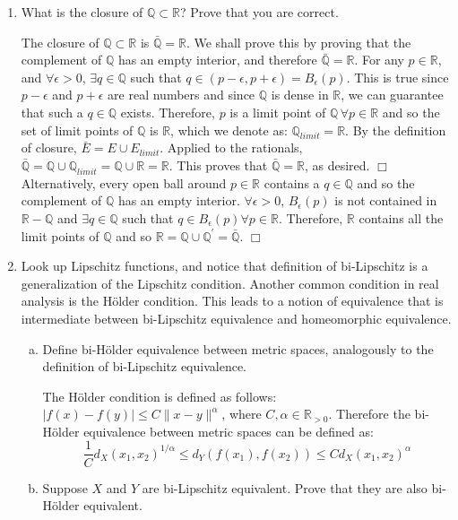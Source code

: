 \documentclass[12pt,letterpaper,reqno]{amsart}
\newcommand{\R}{\mathbb R}
\newcommand{\Q}{\mathbb Q}
\begin{document}
\begin{enumerate}[1.]
\item What is the closure of $\Q\subset \R$? Prove that you are correct.
\begin{flushleft}
The closure of $\Q\subset \R$ is $\bar{\Q} = \R$. We shall prove this by proving that the complement of $\Q$ has an empty interior, and therefore $\bar{\Q} = \R$. \newline
For any $p \in \R$, and $\forall \epsilon > 0$, $\exists q \in \Q$ such that $q \in (p-\epsilon,p+\epsilon) = B_\epsilon(p)$. This is true since $p-\epsilon$ and $p+\epsilon$ are real numbers and since $\Q$ is dense in $\R$, we can guarantee that such a $q \in \Q$ exists. Therefore, $p$ is a limit point of $\Q \, \forall p \in \R$ and so the set of limit points of $\Q$ is $\R$, which we denote as: $\Q_{limit} = \R$. By the definition of closure, $\bar{E} = E \cup E_{limit}$. Applied to the rationals, $\bar{\Q} = \Q \cup \Q_{limit} = \Q \cup \R = \R$. This proves that $\bar{\Q} = \R$, as desired. $\Box$\newline
Alternatively, every open ball around $p \in \R$ contains a $q \in \Q$ and so the complement of $\Q$ has an empty interior. $\forall \epsilon > 0$, $B_\epsilon(p)$ is not contained in $\R - \Q$ and $\exists q \in \Q$ such that $q \in B_\epsilon(p) \forall p \in \R$. Therefore, $\R$ contains all the limit points of $\Q$ and so $\R = \Q \cup \Q^\prime = \bar{\Q}$. $\Box$
\end{flushleft}

\item Look up Lipschitz functions, and notice that definition of bi-Lipschitz is a generalization of the Lipschitz condition. Another common condition in real analysis is the H\"older condition. This leads to a notion of equivalence that is intermediate between bi-Lipschitz equivalence and homeomorphic equivalence.
\begin{enumerate}[(a)]
\item Define bi-H\"older equivalence between metric spaces, analogously to the definition of bi-Lipschitz equivalence.

\begin{flushleft}
The H\"older condition is defined as follows: $|f(x)-f(y)| \leq C\|x-y\|^\alpha$, where $C,\alpha \in \R_{>0}$. Therefore the bi-H\"older equivalence between metric spaces can be defined as:
$$\frac{1}{C}d_X(x_1, x_2)^{1/\alpha} \leq d_Y(f(x_1),f(x_2)) \leq Cd_X(x_1, x_2)^\alpha$$
\end{flushleft}

\item Suppose $X$ and $Y$ are bi-Lipschitz equivalent. Prove that they are also bi-H\"older equivalent.


\end{enumerate}
\end{enumerate}
\end{document}
